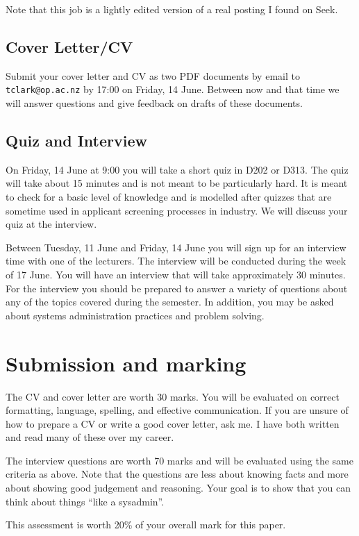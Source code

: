 \documentclass{article}   	%
\begin{document}
Note that this job is a lightly edited version of a real posting I found on Seek.

\subsection{Cover Letter/CV}

Submit your cover letter and CV as two PDF documents by email to \texttt{tclark@op.ac.nz} by 17:00 on Friday, 14 June.  Between now and that time we will answer questions and give feedback on drafts of these documents.  

\subsection{Quiz and Interview}
On Friday, 14 June at 9:00 you will take a short quiz in D202 or D313. The quiz will take about 15 minutes and is not meant to be particularly hard. It is meant to check for a basic level of knowledge and is modelled after quizzes that are sometime used in applicant screening processes in industry. We will discuss your quiz at the interview.
  
Between Tuesday, 11 June and Friday, 14 June you will sign up for an interview time with one of the lecturers. The interview will be conducted during the week of 17 June. You will have an interview that will take approximately 30 minutes. For the interview you should be prepared to answer a variety of questions about any of the topics covered during the semester. In addition, you may be asked about systems administration practices and problem solving.

\newpage

\section{Submission and marking}

The CV and cover letter are worth 30 marks. You will be evaluated on correct formatting, language, spelling, and effective communication. If you are unsure of how to prepare a CV or write a good cover letter, ask me. I have both written and read many of these over my career. 

The interview questions are worth 70 marks and will be evaluated using the same criteria as above. Note that the questions are less about knowing facts and more about showing good judgement and reasoning. Your goal is to show that you can think about things ``like a sysadmin''.

This assessment is worth 20\% of your overall mark for this paper.
 
\end{document}
